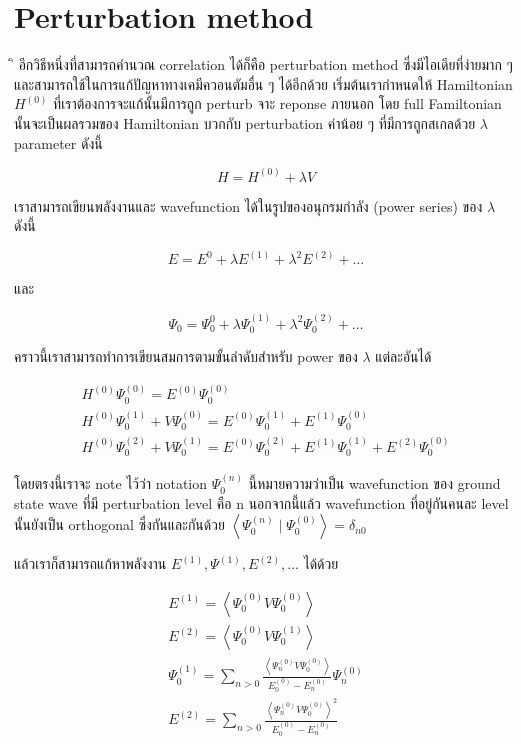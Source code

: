 \section{Perturbation method}

ิ อีกวิธีหนึ่งที่สามารถคำนวณ correlation ได้ก็คือ perturbation method ซึ่งมีไอเดียที่ง่ายมาก ๆ
และสามารถใช้ในการแก้ปัญหาทางเคมีควอนตัมอื่น ๆ ได้อีกด้วย เริ่มต้นเรากำหนดให้ Hamiltonian
$H^{(0)}$ ที่เราต้องการจะแก้นั้นมีการถูก perturb จาะ reponse ภายนอก โดย full
Familtonian นั้นจะเป็นผลรวมของ Hamiltonian บวกกับ perturbation ค่าน้อย ๆ
ที่มีการถูกสเกลด้วย $\lambda$ parameter ดังนี้

\begin{equation}
    H = H^{(0)} + \lambda V
\end{equation}

เราสามารถเขียนพลังงานและ wavefunction ได้ในรูปของอนุกรมกำลัง (power series)
ของ $\lambda$ ดังนี้

\begin{equation}
    E = E^{0} + \lambda E^{(1)} + \lambda^{2} E^{(2)} + \dots
\end{equation}

\noindent และ

\begin{equation}
    \Psi_{0} = \Psi_{0}^{0} + \lambda \Psi_{0}^{(1)}
    + \lambda^{2} \Psi_{0}^{(2)} + \dots
\end{equation}

คราวนี้เราสามารถทำการเขียนสมการตามขั้นลำดับสำหรับ power ของ $\lambda$ แต่ละอันได้

\begin{gather}
    H^{(0)} \Psi_0^{(0)} = E^{(0)} \Psi_0^{(0)} \\
    H^{(0)} \Psi_0^{(1)}+V \Psi_0^{(0)}
    = E^{(0)} \Psi_0^{(1)}+E^{(1)} \Psi_0^{(0)} \\
    H^{(0)} \Psi_0^{(2)}+V \Psi_0^{(1)}
    = E^{(0)} \Psi_0^{(2)}+E^{(1)} \Psi_0^{(1)}+E^{(2)} \Psi_0^{(0)}
\end{gather}

โดยตรงนี้เราจะ note ไว้ว่า notation $\Psi_0^{(n)}$ นี้หมายความว่าเป็น wavefunction
ของ ground state wave ที่มี perturbation level คือ $\mathrm{n}$
นอกจากนี้แล้ว wavefunction ที่อยู่กันคนละ level นั้นยังเป็น orthogonal ซึ่งกันและกันด้วย
$\left\langle\Psi_0^{(n)} \mid \Psi_0^{(0)}\right\rangle = \delta_{n 0}$

แล้วเราก็สามารถแก้หาพลังงาน $E^{(1)}, \Psi^{(1)}, E^{(2)}, \dots$ ได้ด้วย

\begin{gather}
    E^{(1)} = \left\langle\Psi_0^{(0)} V \Psi_0^{(0)}\right\rangle \\
    E^{(2)} = \left\langle\Psi_0^{(0)} V \Psi_0^{(1)}\right\rangle \\
    \Psi_0^{(1)} = \sum_{n>0} \frac{\left\langle\Psi_n^{(0)} V \Psi_0^{(0)}\right\rangle}
    {E_0^{(0)}-E_n^{(0)}} \Psi_n^{(0)} \\
    E^{(2)} = \sum_{n>0} \frac{\left\langle\Psi_n^{(0)} V \Psi_0^{(0)}\right\rangle^2}
    {E_0^{(0)}-E_n^{(0)}}
\end{gather}

